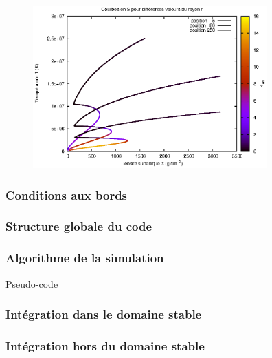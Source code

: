 \documentclass[french]{beamer}
\begin{document}

\begin{frame}

   \begin{figure}[htb!]
      \includegraphics[width=9cm]{figures/S_curves_tau.eps}
   \end{figure}
\end{frame}


\begin{frame}
    \frametitle{Conditions aux bords}
\end{frame}

\begin{frame}
    \frametitle{Structure globale du code}
\end{frame}

\begin{frame}
    \frametitle{Algorithme de la simulation}
    Pseudo-code
\end{frame}

\begin{frame}
\end{frame}

\begin{frame}
    \frametitle{Intégration dans le domaine stable}
\end{frame}

\begin{frame}
    \frametitle{Intégration hors du domaine stable}
\end{frame}
\end{document}
